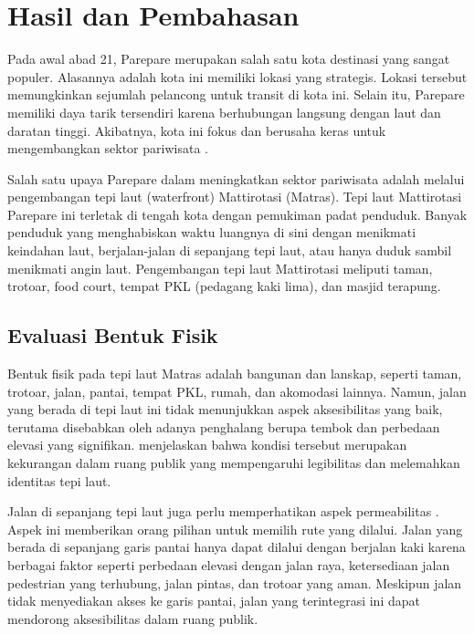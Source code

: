 \documentclass[11pt]{simart} %
\begin{document}

\section{Hasil dan Pembahasan}%

Pada awal abad 21, Parepare merupakan salah satu kota destinasi yang sangat populer. Alasannya adalah kota ini memiliki lokasi yang strategis. Lokasi tersebut memungkinkan sejumlah pelancong untuk transit di kota ini. Selain itu, Parepare memiliki daya tarik tersendiri karena berhubungan langsung dengan laut dan daratan tinggi. Akibatnya, kota ini fokus dan berusaha keras untuk mengembangkan sektor pariwisata \citep{faniapriani2018}.

Salah satu upaya Parepare dalam meningkatkan sektor pariwisata adalah melalui pengembangan tepi laut (waterfront) Mattirotasi (Matras). Tepi laut Mattirotasi Parepare ini terletak di tengah kota dengan pemukiman padat penduduk. Banyak penduduk yang menghabiskan waktu luangnya di sini dengan menikmati keindahan laut, berjalan-jalan di sepanjang tepi laut, atau hanya duduk sambil menikmati angin laut. Pengembangan tepi laut Mattirotasi meliputi taman, trotoar, food court, tempat PKL (pedagang kaki lima), dan masjid terapung.

\subsection{Evaluasi Bentuk Fisik}%
\label{sub:Evaluasi Bentuk Fisik}

Bentuk fisik pada tepi laut Matras adalah bangunan dan lanskap, seperti taman, trotoar, jalan, pantai, tempat PKL, rumah, dan akomodasi lainnya. Namun, jalan yang berada di tepi laut ini tidak menunjukkan aspek aksesibilitas yang baik, terutama disebabkan oleh adanya penghalang berupa tembok dan perbedaan elevasi yang signifikan. \cite{iqbal2020} menjelaskan bahwa kondisi tersebut merupakan kekurangan dalam ruang publik yang mempengaruhi legibilitas dan melemahkan identitas tepi laut.

Jalan di sepanjang tepi laut juga perlu memperhatikan aspek permeabilitas \citep{wanismail2018}. Aspek ini memberikan orang pilihan untuk memilih rute yang dilalui. Jalan yang berada di sepanjang garis pantai hanya dapat dilalui dengan berjalan kaki karena berbagai faktor seperti perbedaan elevasi dengan jalan raya, ketersediaan jalan pedestrian yang terhubung, jalan pintas, dan trotoar yang aman. Meskipun jalan tidak menyediakan akses ke garis pantai, jalan yang terintegrasi ini dapat mendorong aksesibilitas dalam ruang publik.
\end{document}
